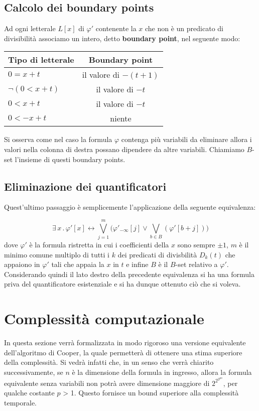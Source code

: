 \documentclass[11pt,letterpaper,twoside]{article}
\begin{document}
\subsection{Calcolo dei boundary points} Ad ogni letterale $L[x]$ di $\varphi '$
contenente la $x$ che non è un predicato di divisibilit\`a associamo un intero,
detto \textbf{boundary point}, nel seguente modo:

\begin{center}
  \begin{tabular}{ l | c }
    Tipo di letterale & Boundary point \\ \hline
    $0=x+t$ & il valore di $-(t + 1)$ \\
    $\lnot (0 < x+t)$ & il valore di $-t$ \\
    $0 < x + t$ & il valore di $-t$ \\
    $0 < -x + t$ &  niente
  \end{tabular}
\end{center}

Si osserva come nel caso la formula $\varphi$ contenga più variabili da
eliminare allora i valori nella colonna di destra possano dipendere da altre
variabili.  Chiamiamo $B$-set l'insieme di questi boundary points.

\subsection{Eliminazione dei quantificatori} Quest'ultimo passaggio è
semplicemente l'applicazione della seguente equivalenza\autocite{cooper}:

$$ \exists \, x \, . \, \varphi'[x] \longleftrightarrow \bigvee_{j=1}^m \Big(
\varphi'_{- \infty}[j] \lor \bigvee_{b \in B}(\varphi'[b+j]) \Big)$$ dove
$\varphi'$ è la formula ristretta in cui i coefficienti della $x$ sono sempre
$\pm 1$, $m$ è il minimo comune multiplo di tutti i $k$ dei predicati di
divisbilit\`a $D_k(t)$ che appaiono in $\varphi'$ tali che appaia la $x$ in $t$
e infine $B$ \`e il $B$-set relativo a $\varphi'$.  Considerando quindi il lato
destro della precedente equivalenza si ha una formula priva del quantificatore
esistenziale e si ha dunque ottenuto ciò che si voleva.

\newpage

\section{Complessità computazionale}
In questa sezione verrà formalizzata in modo rigoroso una versione equivalente
dell'algoritmo di Cooper, la quale permetterà di ottenere una stima superiore
della complessità.
Si vedrà infatti che, in un senso che verrà chiarito successivamente, se $n$ è
la dimensione della formula in ingresso, allora la formula equivalente senza
variabili non potrà avere dimensione maggiore di $2^{2^{2^{pn}}}$, per qualche
costante $p$ > 1. Questo fornisce un bound superiore alla complessità temporale.
\end{document}
